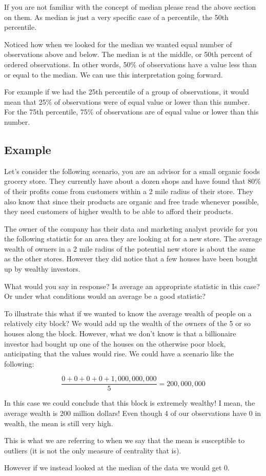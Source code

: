\documentclass[
]{book}
\begin{document}
If you are not familiar with the concept of median please read the above section on them. As median is just a very specific case of a percentile, the 50th percentile.

Noticed how when we looked for the median we wanted equal number of observations above and below. The median is at the middle, or 50th percent of ordered observations. In other words, 50\% of observations have a value less than or equal to the median. We can use this interpretation going forward.

For example if we had the 25th percentile of a group of observations, it would mean that 25\% of observations were of equal value or lower than this number. For the 75th percentile, 75\% of observations are of equal value or lower than this number.

\hypertarget{example}{%
\subsection{Example}\label{example}}

Let's consider the following scenario, you are an advisor for a small organic foods grocery store. They currently have about a dozen shops and have found that 80\% of their profits come from customers within a 2 mile radius of their store. They also know that since their products are organic and free trade whenever possible, they need customers of higher wealth to be able to afford their products.

The owner of the company has their data and marketing analyst provide for you the following statistic for an area they are looking at for a new store. The average wealth of owners in a 2 mile radius of the potential new store is about the same as the other stores. However they did notice that a few houses have been bought up by wealthy investors.

What would you say in response? Is average an appropriate statistic in this case? Or under what conditions would an average be a good statistic?

To illustrate this what if we wanted to know the average wealth of people on a relatively city block? We would add up the wealth of the owners of the 5 or so houses along the block. However, what we don't know is that a billionaire investor had bought up one of the houses on the otherwise poor block, anticipating that the values would rise. We could have a scenario like the following:

\[\frac{0 + 0 + 0 + 0 + 1,000,000,000}{5}=200,000,000\]

In this case we could conclude that this block is extremely wealthy! I mean, the average wealth is 200 million dollars! Even though 4 of our observations have 0 in wealth, the mean is still very high.

This is what we are referring to when we say that the mean is susceptible to outliers (it is not the only measure of centrality that is).

However if we instead looked at the median of the data we would get 0.
\end{document}
